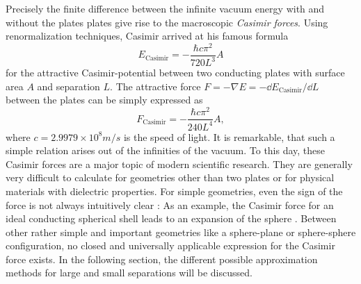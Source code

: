Precisely the finite difference between the infinite vacuum energy with and without the plates plates give rise to the macroscopic \emph{Casimir forces}.
Using renormalization techniques, Casimir arrived at his famous formula \cite{Casimir_1948}
\begin{equation}\label{eq:3:casimir-energy-pp-conducting}
  E_\mathrm{Casimir} = -\frac{\hbar c \pi^2}{720 L^3} A
\end{equation}
for the attractive Casimir-potential between two conducting plates with surface area $A$ and separation $L$.
The attractive force $F=-\nabla E = -\dd E_\mathrm{Casimir} / \dd L$ between the plates can be simply expressed as
\begin{equation}\label{eq:3:casimir-force-pp-conducting}
  F_\mathrm{Casimir} = - \frac{\hbar c \pi^2}{240 L^4} A ,
\end{equation}
where $c=2.9979\times 10^{8}\si{m/s}$ is the speed of light.
It is remarkable, that such a simple relation arises out of the infinities of the vacuum.
To this day, these Casimir forces are a major topic of modern scientific research. They are generally very difficult to calculate for geometries other than two plates or for physical materials with dielectric properties. 
For simple geometries, even the sign of the force is not always intuitively clear \cite{Klimchitskaya_2009}: As an example, the Casimir force for an ideal conducting spherical shell leads to an expansion of the sphere \cite{Boyer_1968}.
Between other rather simple and important geometries like a sphere-plane or sphere-sphere configuration, no closed and universally applicable expression for the Casimir force exists.
In the following section, the different possible approximation methods for large and small separations will be discussed.

